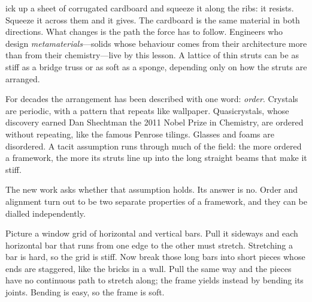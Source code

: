 \documentclass[11pt,twocolumn]{article}
\newcommand{\sect}[1]{\par\needspace{5\baselineskip}\medskip{\sffamily\bfseries\color{accent}\MakeUppercase{#1}}\par\smallskip\noindent}
\begin{document}

ick up a sheet of corrugated cardboard and squeeze it along the ribs: it resists. Squeeze it across them and it gives. The cardboard is the same material in both directions. What changes is the path the force has to follow. Engineers who design \emph{metamaterials}---solids whose behaviour comes from their architecture more than from their chemistry---live by this lesson. A lattice of thin struts can be as stiff as a bridge truss or as soft as a sponge, depending only on how the struts are arranged.

For decades the arrangement has been described with one word: \emph{order}. Crystals are periodic, with a pattern that repeats like wallpaper. Quasicrystals, whose discovery earned Dan Shechtman the 2011 Nobel Prize in Chemistry, are ordered without repeating, like the famous Penrose tilings. Glasses and foams are disordered. A tacit assumption runs through much of the field: the more ordered a framework, the more its struts line up into the long straight beams that make it stiff.

The new work asks whether that assumption holds. Its answer is no. Order and alignment turn out to be two separate properties of a framework, and they can be dialled independently.

\sect{Why straight lines matter}
Picture a window grid of horizontal and vertical bars. Pull it sideways and each horizontal bar that runs from one edge to the other must stretch. Stretching a bar is hard, so the grid is stiff. Now break those long bars into short pieces whose ends are staggered, like the bricks in a wall. Pull the same way and the pieces have no continuous path to stretch along; the frame yields instead by bending its joints. Bending is easy, so the frame is soft.
\end{document}
